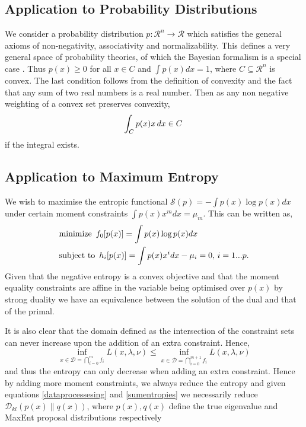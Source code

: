 \documentclass[letterpaper]{article} %
\begin{document}
\subsection{Application to Probability Distributions}
We consider a probability distribution $p:\mathcal{R}^{n} \rightarrow \mathcal{R}$ which satisfies the general axioms of non-negativity, associativity and normalizability. This defines a very general space of probability theories, of which the Bayesian formalism is a special case \cite{walley_1991}. Thus $p(x) \geq 0$ for all $x \in C$ and $\int p(x)dx = 1$, where $C \subseteq \mathcal{R}^{n}$ is convex. The last condition follows from the definition of convexity and the fact that any sum of two real numbers is a real number. Then as any non negative weighting of a convex set preserves convexity,
\begin{equation}
\int_{C}p(x)x\thinspace dx \in C \thinspace
\end{equation}
if the integral exists.

\subsection{Application to Maximum Entropy}
\label{entropydecreaseproof}
We wish to maximise the entropic functional $\mathcal{S}(p) = -\int p(x)\log p(x)dx$ under certain moment constraints $\int p(x)x^{m}dx = \mu_{m}$. This can be written as,
\begin{equation}
\begin{aligned}
&\text{minimize } \thinspace f_{0}[p(x)] = \int p(x)\log p(x)dx\\
&\text{subject to } \thinspace h_{i}[p(x)] = \int p(x)x^{i}dx - \mu_{i} = 0, \thinspace i=1...p.
\end{aligned}
\end{equation}
Given that the negative entropy is a convex objective and that the moment equality constraints are affine in the variable being optimised over $p(x)$ by strong duality we have an equivalence between the solution of the dual and that of the primal.

It is also clear that the domain defined as the intersection of the constraint sets can never increase upon the addition of an extra constraint. Hence,
\begin{equation}
\underset{x \in \mathcal{D}=\bigcap\limits_{i=0}^{m}f_{i}}{\inf}L(x,\lambda, \nu) \leq \underset{x \in \mathcal{D}=\bigcap\limits_{i=0}^{m+1}f_{i}}{\inf}L(x,\lambda, \nu)
\end{equation}
and thus the entropy can only decrease when adding an extra constraint. Hence by adding more moment constraints, we always reduce the entropy and given equations \eqref{dataprocessesing} and \eqref{sumentropies} we necessarily reduce $\mathcal{D}_{kl}(p(x)\|q(x))$, where $p(x), q(x)$ define the true eigenvalue and MaxEnt proposal distributions respectively
\end{document}
